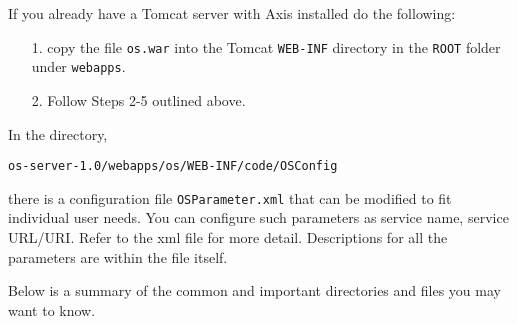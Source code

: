 \documentclass[11pt]{article}
\renewcommand{\_}{{\char"5F}}
\renewcommand{\{}{{\char"7B}}
\renewcommand{\}}{{\char"7D}}
\renewcommand{\^}{{\char"0D}}
\renewcommand{\'}{{\char"0D}}
\begin{document}
If you already have a Tomcat server with Axis installed do the following:
\begin{itemize}
\item[1.] copy the file {\tt os.war} into the Tomcat {\tt WEB-INF} directory in the {\tt ROOT} folder under {\tt webapps}.

\item[2.]  Follow Steps 2-5 outlined above.
\end{itemize}

In the directory,
\begin{verbatim}
os-server-1.0/webapps/os/WEB-INF/code/OSConfig
\end{verbatim}
there is a configuration file {\tt OSParameter.xml} that can be modified to fit individual user needs. You can configure such parameters as service name, service URL/URI. Refer to the xml file for more detail. Descriptions for all the parameters are within the file itself.

\vskip 8pt

Below is a summary of the common and important directories and files you may want to know.
\end{document}
